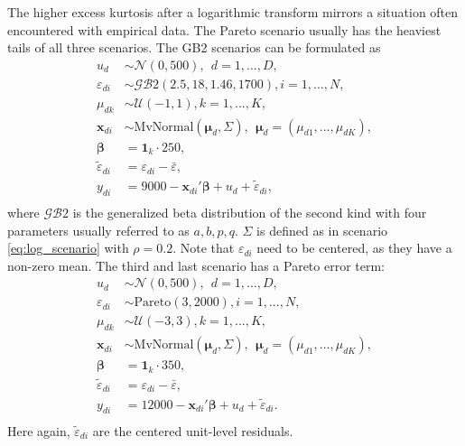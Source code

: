 The higher excess kurtosis after a logarithmic transform mirrors a situation often encountered with empirical data. The Pareto scenario usually has the heaviest tails of all three scenarios. The GB2 scenarios can be formulated as
\begin{equation}
    \begin{split}
        u_d & \sim \mathcal N(0, 500), ~~ d = 1,...,D,\\
        \varepsilon_{di} & \sim \mathcal{GB}2(2.5, 18, 1.46, 1700), i = 1,...,N,\\
        \mu_{dk} & \sim \mathcal{U}(-1, 1), k = 1,...,K,\\
        \boldsymbol x_{di}  &\sim \text{MvNormal} (\boldsymbol \mu_{d}, \Sigma) ,
        ~~ \boldsymbol \mu_{d} = (\mu_{d1}, ..., \mu_{dK}),\\
        \boldsymbol\beta & =  \mathbf{1}_k \cdot 250,\\
        \tilde{\varepsilon}_{di} & = \varepsilon_{di} - \bar \varepsilon,  \\
        y_{di} & = 9000 - \boldsymbol x_{di}' \boldsymbol \beta + u_d + \tilde \varepsilon_{di}, \\
    \end{split}
    \label{eq:gb2_scenario}
\end{equation}
where $\mathcal{GB}2$ is the generalized beta distribution of the second kind with four parameters usually referred to as $a, b, p, q$. $\Sigma$ is defined as in scenario \ref{eq:log_scenario} with $\rho = 0.2$. Note that $\varepsilon_{di}$ need to be centered, as they have a non-zero mean. The third and last scenario has a Pareto error term:
\begin{equation}
    \begin{split}
        u_d & \sim \mathcal N(0, 500), ~~ d = 1,...,D,\\
        \varepsilon_{di} & \sim \text{Pareto}(3, 2000), i = 1,...,N,\\
        \mu_{dk} & \sim \mathcal{U}(-3, 3), k = 1,...,K,\\
        \boldsymbol x_{di}  &\sim \text{MvNormal} (\boldsymbol \mu_{d}, \Sigma) ,
        ~~ \boldsymbol \mu_{d} = (\mu_{d1}, ..., \mu_{dK}),\\
        \boldsymbol\beta & =  \mathbf{1}_k \cdot 350,\\
        \tilde{\varepsilon}_{di} & = \varepsilon_{di} - \bar \varepsilon,  \\
        y_{di} & = 12000 - \boldsymbol x_{di}' \boldsymbol \beta    + u_d + \tilde \varepsilon_{di}.\\
    \end{split}
    \label{eq:pareto_scenario}
\end{equation}
Here again, $\tilde \varepsilon_{di}$ are the centered unit-level residuals.